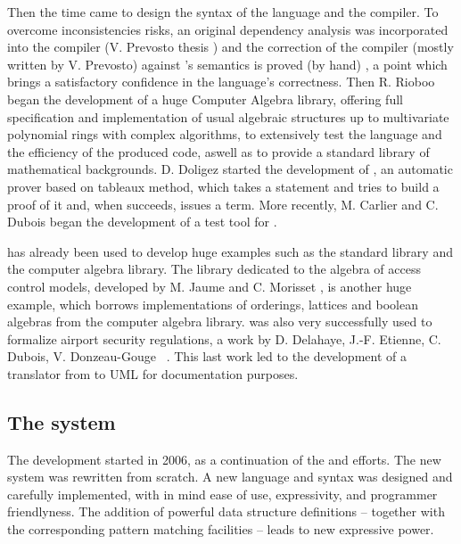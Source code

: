 Then the time came to design the syntax of the language and the compiler. To
overcome inconsistencies risks, an original dependency analysis was
incorporated into the compiler (V. Prevosto
thesis \cite{PrevostoPhD03,TPHOL2002,PrevostoJAR02}) and the correction of the
compiler (mostly written by V. Prevosto) against {\oldfocal}'s semantics is
proved (by hand) \cite{TLCA2005}, a point which
brings a satisfactory confidence in the language's correctness. Then
R. Rioboo \cite{xxx} began the development of a huge Computer Algebra %
library, offering full specification
and implementation of usual algebraic structures up to multivariate
polynomial rings with complex algorithms, to
extensively test the language and the
efficiency  of the produced code, aswell as to provide a standard library
of mathematical backgrounds. D. Doligez \cite{ZenonBDD} started the
development of {\zenon}, an automatic prover based on tableaux method,
which takes a {\oldfocal} statement and tries to build a proof of it and,
when succeeds,  issues a {\coq} term. More  recently, M. Carlier and
C. Dubois\cite{CarlierDuboisLNCS2008} began the development of a
test tool for {\oldfocal}.

{\oldfocal} has already been used to develop huge examples such as  the
standard library and the computer algebra library. The library
dedicated to the algebra of access control models, developed by
M. Jaume and C. Morisset \cite{jias06,fcsarspa06,MorissetPhd},
is another huge example, which borrows implementations of orderings,
lattices and boolean algebras from the computer algebra library.
{\oldfocal} was also very successfully used to formalize airport security
regulations, a work by D. Delahaye, J.-F. Etienne, C.  Dubois,
V. Donzeau-Gouge ~\cite{EDEMOI-All,EDEMOI-Model,EDEMOI-Proof}. This
last work led to the development of a translator \cite{Focal-UML}
from {\oldfocal} to UML for documentation purposes.

\subsection*{The {\focal} system}

The {\focal} development started in 2006, as a
continuation of the {\foc} and {\oldfocal} efforts. The new system was rewritten
from scratch. A new language and syntax was designed and carefully
implemented, with in mind ease of use, expressivity, and programmer
friendlyness. The addition of powerful data structure definitions -- together
with the corresponding pattern matching facilities -- leads to new expressive
power.

